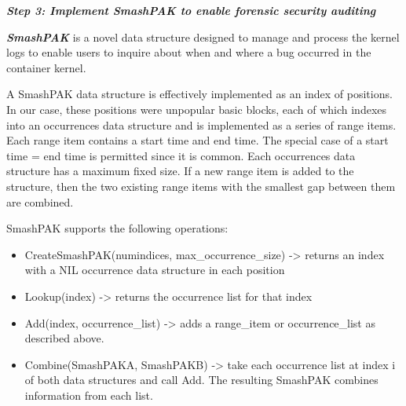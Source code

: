  
\noindent
\textit{\textbf{Step 3: Implement SmashPAK to enable forensic security auditing}}

\textit{\textbf{SmashPAK}} is a novel data structure designed to manage and process the kernel logs to enable users to inquire about when and where a bug occurred in the container kernel. 

A SmashPAK data structure is effectively implemented as an index of positions. In our case, these positions were unpopular basic blocks, 
each of which indexes into an occurrences data structure and is implemented as a series of range items.  Each range item contains a start time and end time. 
The special case of a start time = end time is permitted since it is common. Each occurrences data structure has a maximum fixed size.  
If a new range item is added to the structure, then the two existing range items with the smallest gap between them are combined.  

SmashPAK supports the following operations:
\begin{itemize}
	\item CreateSmashPAK(numindices, max\_occurrence\_size) -> returns an index with a NIL occurrence data structure in each position
	\item Lookup(index) -> returns the occurrence list for that index
	\item Add(index, occurrence\_list) -> adds a range\_item or occurrence\_list as described above.
	\item Combine(SmashPAKA, SmashPAKB) -> take each occurrence list at index i of both data structures and call Add.  The resulting SmashPAK combines information from each list.
\end{itemize}

